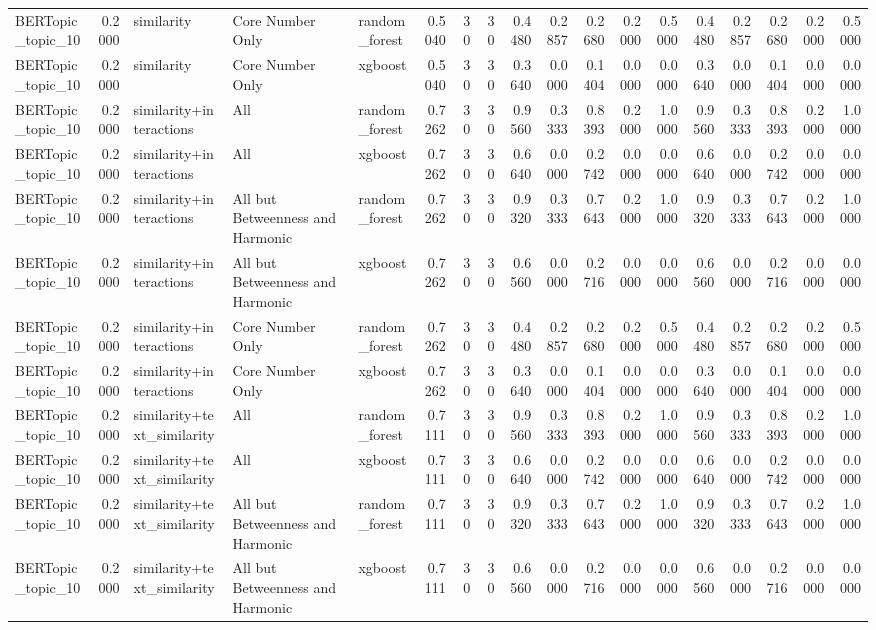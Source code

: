 \begin{tabular}{lrlllrrrrrrrrrrrrr}
BERTopic_topic_10 & 0.2000 & similarity & Core Number Only & random_forest & 0.5040 & 30 & 30 & 0.4480 & 0.2857 & 0.2680 & 0.2000 & 0.5000 & 0.4480 & 0.2857 & 0.2680 & 0.2000 & 0.5000 \\
BERTopic_topic_10 & 0.2000 & similarity & Core Number Only & xgboost & 0.5040 & 30 & 30 & 0.3640 & 0.0000 & 0.1404 & 0.0000 & 0.0000 & 0.3640 & 0.0000 & 0.1404 & 0.0000 & 0.0000 \\
BERTopic_topic_10 & 0.2000 & similarity+interactions & All & random_forest & 0.7262 & 30 & 30 & 0.9560 & 0.3333 & 0.8393 & 0.2000 & 1.0000 & 0.9560 & 0.3333 & 0.8393 & 0.2000 & 1.0000 \\
BERTopic_topic_10 & 0.2000 & similarity+interactions & All & xgboost & 0.7262 & 30 & 30 & 0.6640 & 0.0000 & 0.2742 & 0.0000 & 0.0000 & 0.6640 & 0.0000 & 0.2742 & 0.0000 & 0.0000 \\
BERTopic_topic_10 & 0.2000 & similarity+interactions & All but Betweenness and Harmonic & random_forest & 0.7262 & 30 & 30 & 0.9320 & 0.3333 & 0.7643 & 0.2000 & 1.0000 & 0.9320 & 0.3333 & 0.7643 & 0.2000 & 1.0000 \\
BERTopic_topic_10 & 0.2000 & similarity+interactions & All but Betweenness and Harmonic & xgboost & 0.7262 & 30 & 30 & 0.6560 & 0.0000 & 0.2716 & 0.0000 & 0.0000 & 0.6560 & 0.0000 & 0.2716 & 0.0000 & 0.0000 \\
BERTopic_topic_10 & 0.2000 & similarity+interactions & Core Number Only & random_forest & 0.7262 & 30 & 30 & 0.4480 & 0.2857 & 0.2680 & 0.2000 & 0.5000 & 0.4480 & 0.2857 & 0.2680 & 0.2000 & 0.5000 \\
BERTopic_topic_10 & 0.2000 & similarity+interactions & Core Number Only & xgboost & 0.7262 & 30 & 30 & 0.3640 & 0.0000 & 0.1404 & 0.0000 & 0.0000 & 0.3640 & 0.0000 & 0.1404 & 0.0000 & 0.0000 \\
BERTopic_topic_10 & 0.2000 & similarity+text_similarity & All & random_forest & 0.7111 & 30 & 30 & 0.9560 & 0.3333 & 0.8393 & 0.2000 & 1.0000 & 0.9560 & 0.3333 & 0.8393 & 0.2000 & 1.0000 \\
BERTopic_topic_10 & 0.2000 & similarity+text_similarity & All & xgboost & 0.7111 & 30 & 30 & 0.6640 & 0.0000 & 0.2742 & 0.0000 & 0.0000 & 0.6640 & 0.0000 & 0.2742 & 0.0000 & 0.0000 \\
BERTopic_topic_10 & 0.2000 & similarity+text_similarity & All but Betweenness and Harmonic & random_forest & 0.7111 & 30 & 30 & 0.9320 & 0.3333 & 0.7643 & 0.2000 & 1.0000 & 0.9320 & 0.3333 & 0.7643 & 0.2000 & 1.0000 \\
BERTopic_topic_10 & 0.2000 & similarity+text_similarity & All but Betweenness and Harmonic & xgboost & 0.7111 & 30 & 30 & 0.6560 & 0.0000 & 0.2716 & 0.0000 & 0.0000 & 0.6560 & 0.0000 & 0.2716 & 0.0000 & 0.0000 \\

\end{tabular}

